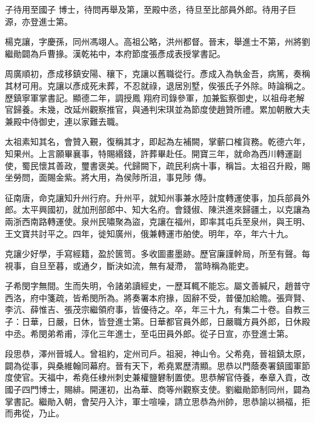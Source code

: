 \begin{pinyinscope}
 子待用至國子
 博士，待問再舉及第，至殿中丞，待旦至比部員外郎。待用子巨源，亦登進士第。



 楊克讓，字慶孫，同州馮翊人。高祖公略，洪州都督。晉末，舉進士不第，州將劉繼勛闢為戶曹掾。漢乾祐中，本府節度張彥成表授掌書記。



 周廣順初，彥成移鎮安陽、穰下，克讓以舊職從行。彥成入為執金吾，病篤，奏稱其材可用。克讓以彥成死未葬，不忍就祿，退居別墅，俟張氏子外除。時論稱之。歷鎮寧軍掌書記。顯德二年，調授鳳
 翔府司錄參軍，加兼監察御史，以祖母老解官歸養。未幾，改延州觀察推官，與通判宋琪並為節度使趙贊所禮。累加朝散大夫兼殿中侍御史，連以家難去職。



 太祖素知其名，會贊入覲，復稱其才，即起為左補闕，掌蘄口榷貨務。乾德六年，知果州。上言願畢襄事，特賜緡錢，許葬畢赴任。開寶三年，就命為西川轉運副使，蜀民懷其善政，璽書褒美。代歸闕下，疏民利病十事，稱旨。太祖召升殿，賜坐勞問，面賜金紫。將大用，為侯陟所沮，事見陟
 傳。



 征南唐，命克讓知升州行府。升州平，就知州事兼水陸計度轉運使事，加兵部員外郎。太平興國初，就加刑部郎中、知大名府。會錢俶、陳洪進來歸疆土，以克讓為兩浙西南路轉運使。泉州民嘯聚為盜，克讓在福州，即率其屯兵至泉州，與王明、王文寶共討平之。四年，徙知廣州，俄兼轉運市舶使。明年，卒，年六十九。



 克讓少好學，手寫經籍，盈於篋笥。多收圖畫墨跡。歷官廉謹幹局，所至有聲。每視事，自旦至暮，或通夕，斷決如流，無有凝滯，
 當時稱為能吏。



 子希閔字無間。生而失明，令諸弟讀經史，一歷耳輒不能忘。屬文善緘尺，趙普守西洛，府中箋疏，皆希閔所為。將奏署本府掾，固辭不受，普優加給贍。張齊賢、李沆、薛惟吉、張茂宗繼領府事，皆優待之。卒，年三十九，有集二十卷。自教三子：日華，日嚴，日休，皆登進士第。日華都官員外郎，日嚴職方員外郎，日休殿中丞。希閔弟希甫，淳化三年進士，至屯田員外郎。從子日宣，亦登進士第。



 段思恭，澤州晉城人。曾祖約，定州司戶。祖昶，神山令。父希堯，晉祖鎮太原，闢為從事，與桑維翰同幕府。晉有天下，希堯累歷清顯。思恭以門蔭奏署鎮國軍節度使官。天福中，希堯任棣州刺史兼權鹽礬制置使。思恭解官侍養，奉章入貢，改國子四門博士，賜緋。開運初，出為華、商等州觀察支使。劉繼勛節制同州，闢為掌書記。繼勛入朝，會契丹入汴，軍士喧噪，請立思恭為州帥，思恭諭以禍福，拒而弗從，乃止。




\end{pinyinscope}
